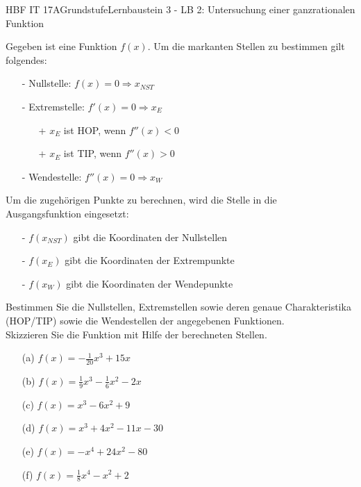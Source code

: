 \documentclass[oneside,openany,headings=optiontotoc,11pt,numbers=noenddot]{scrreprt}
\begin{document}
	\begin{worksheet}{HBF IT 17A}{Grundstufe}{Lernbaustein 3 - LB 2: Untersuchung einer ganzrationalen Funktion}
		\begin{framed}
			\noindent
			\tiny
			Gegeben ist eine Funktion \(f(x)\). Um die markanten Stellen zu bestimmen gilt folgendes:
			\begin{itemize}
				\item[-] Nullstelle: \(f(x) = 0 \Rightarrow x_{NST}\)
				\item[-] Extremstelle: \(f'(x) = 0 \Rightarrow x_E\)
				\begin{itemize}
					\item[+] \(x_E\) ist HOP, wenn \(f''(x) < 0\)
					\item[+] \(x_E\) ist TIP, wenn \(f''(x) > 0\)
				\end{itemize}
				\item[-] Wendestelle: \(f''(x) = 0 \Rightarrow x_W\)
			\end{itemize}
			Um die zugehörigen Punkte zu berechnen, wird die Stelle in die Ausgangsfunktion eingesetzt:
			\begin{itemize}
				\item[-] \(f(x_{NST})\) gibt die Koordinaten der Nullstellen
				\item[-] \(f(x_{E})\) gibt die Koordinaten der Extrempunkte
				\item[-] \(f(x_{W})\) gibt die Koordinaten der Wendepunkte
			\end{itemize}
		\end{framed}
		\begin{framed}
			\noindent\normalsize
			Bestimmen Sie die Nullstellen, Extremstellen sowie deren genaue Charakteristika (HOP/TIP) sowie die Wendestellen der angegebenen Funktionen.\\
			Skizzieren Sie die Funktion mit Hilfe der berechneten Stellen.
			\begin{itemize}
				\item[(a)] \(f(x) = -\frac{1}{20}x^3 +15x\)
				\item[(b)] \(f(x) = \frac{1}{9}x^3 -\frac{1}{6}x^2 -2x\)
				\item[(c)] \(f(x) = x^3-6x^2+9\)
				\item[(d)] \(f(x) = x^3+4x^2-11x-30\)
				\item[(e)] \(f(x) = -x^4 +24x^2 - 80\)
				\item[(f)] \(f(x) = \frac{1}{8}x^4 -x^2 +2\)
			\end{itemize}
			\hdashrule[0.5ex][x]{\textwidth}{0.1mm}{8mm 2pt}\\
		\end{framed}
	\end{worksheet}
\end{document}

